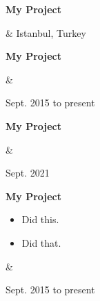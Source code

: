 \documentclass[10pt, letterpaper]{article}
\newenvironment{highlights}{
        \begin{itemize}[
                topsep=0pt,
                parsep=0.10 cm,
                partopsep=0pt,
                itemsep=0pt,
                after=\vspace{-1\baselineskip},
                leftmargin=0.4 cm + 3pt
            ]
    }{
        \end{itemize}
    } %
\let\originalTabularx\tabularx
\let\originalEndTabularx\endtabularx
\renewenvironment{tabularx}{\bgroup\centering\originalTabularx}{\originalEndTabularx\par\egroup}
\begin{document}
        \vspace{0.2 cm}
        \begin{tabularx}{
            \textwidth-0.4 cm-0.13cm
        }{
            K{0.2 cm}
            R{4.1 cm}
        }
            \textbf{My Project}

            \vspace{0.10 cm}

            &
            Istanbul, Turkey

            
        \end{tabularx}


        \vspace{0.2 cm}
        \begin{tabularx}{
            \textwidth-0.4 cm-0.13cm
        }{
            K{0.2 cm}
            R{4.1 cm}
        }
            \textbf{My Project}

            \vspace{0.10 cm}

            &
            

            Sept. 2015 to present
        \end{tabularx}


        \vspace{0.2 cm}
        \begin{tabularx}{
            \textwidth-0.4 cm-0.13cm
        }{
            K{0.2 cm}
            R{4.1 cm}
        }
            \textbf{My Project}

            \vspace{0.10 cm}

            &
            

            Sept. 2021
        \end{tabularx}


        \vspace{0.2 cm}
        \begin{tabularx}{
            \textwidth-0.4 cm-0.13cm
        }{
            K{0.2 cm}
            R{4.1 cm}
        }
            \textbf{My Project}

            \vspace{0.10 cm}

            \begin{highlights}
                \item Did this.
                \item Did that.
            \end{highlights}
            &
            

            Sept. 2015 to present
        \end{tabularx}
\end{document}
